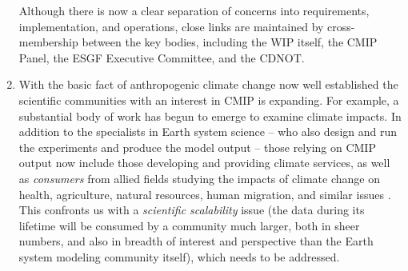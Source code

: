 \documentclass[gmd,manuscript]{copernicus}
\begin{document}
\begin{enumerate}
  Although there is now a clear separation of concerns into
  requirements, implementation, and operations, close links are
  maintained by cross-membership between the key bodies, including the
  WIP itself, the CMIP Panel, the ESGF Executive Committee, and the
  CDNOT.
\item\label{broad} With the basic fact of anthropogenic climate change
  now well established \citep[see, e.g.,][]{ref:stockeretal2013} the
  scientific communities with an interest in CMIP is expanding. For
  example, a substantial body of work has begun to emerge to examine
  climate impacts. In addition to the specialists in Earth system
  science -- who also design and run the experiments and produce the
  model output -- those relying on CMIP output now include those
  developing and providing climate services, as well as
  \emph{consumers} from allied fields studying the impacts of climate
  change on health, agriculture, natural resources, human migration,
  and similar issues \citep{ref:mossetal2010}. This confronts us with
  a \emph{scientific scalability} issue (the data during its lifetime
  will be consumed by a community much larger, both in sheer numbers,
  and also in breadth of interest and perspective than the Earth
  system modeling community itself), which needs to be addressed.


\end{enumerate}
\end{document}
